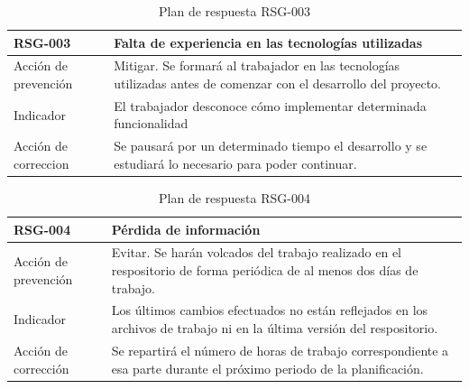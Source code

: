 \begin{table}[htpb]
\centering
\caption{Plan de respuesta RSG-003}
\begin{tabularx}{\textwidth}{|l|X|}
\hline
RSG-003              & Falta de experiencia en las tecnologías utilizadas                                                                \\ \hline
Acción de prevención & Mitigar. Se formará al trabajador en las tecnologías utilizadas antes de comenzar con el desarrollo del proyecto. \\ \hline
Indicador            & El trabajador desconoce cómo implementar determinada funcionalidad                                                \\ \hline
Acción de correccion & Se pausará por un determinado tiempo el desarrollo y se estudiará lo necesario para poder continuar.              \\ \hline
\end{tabularx}
\end{table}


\begin{table}[htpb]
\centering
\caption{Plan de respuesta RSG-004}
\begin{tabularx}{\textwidth}{|l|X|}
\hline
RSG-004              & Pérdida de información                                                                                                  \\ \hline
Acción de prevención & Evitar. Se harán volcados del trabajo realizado en el respositorio de forma periódica de al menos dos días de trabajo.  \\ \hline
Indicador            & Los últimos cambios efectuados no están reflejados en los archivos de trabajo ni en la última versión del respositorio. \\ \hline
Acción de corrección & Se repartirá el número de horas de trabajo correspondiente a esa parte durante el próximo periodo de la planificación.  \\ \hline
\end{tabularx}
\end{table}


